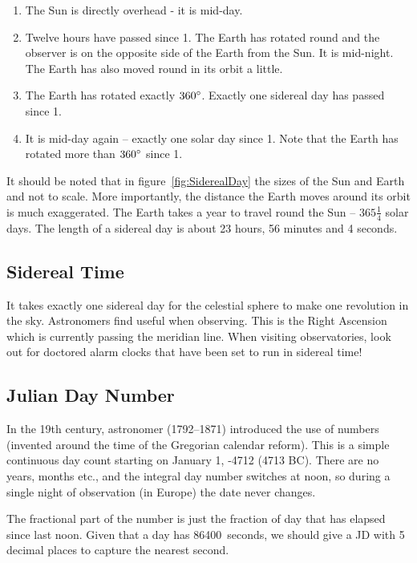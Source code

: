 \begin{enumerate}
\item
  The Sun is directly overhead - it is mid-day.
\item
  Twelve hours have passed since 1. The Earth has rotated round and the
  observer is on the opposite side of the Earth from the Sun. It is
  mid-night. The Earth has also moved round in its orbit a little.
\item
  The Earth has rotated exactly $360\degree$. Exactly one sidereal day has
  passed since 1.
\item
  It is mid-day again -- exactly one solar day since 1. Note that the
  Earth has rotated more than $360\degree$ since 1.
\end{enumerate}

\noindent It should be noted that in figure~\ref{fig:SiderealDay} the sizes of
the Sun and Earth and not to scale. More importantly, the distance the
Earth moves around its orbit is much exaggerated. The Earth takes a
year to travel round the Sun --
$365\frac{1}{4}$ solar days. The length of a
sidereal day is about 23 hours, 56 minutes and 4 seconds.

\subsection{Sidereal Time}
\label{sec:Concepts:SiderealTime}

It takes exactly one sidereal day for the celestial sphere to make one
revolution in the sky. Astronomers find 
useful when observing. This is the Right Ascension which is currently
passing the meridian line.  When visiting observatories, look out for
doctored alarm clocks that have been set to run in sidereal time!

\subsection{Julian Day Number}
\label{sec:Concepts:JulianDay}

In the 19th century, astronomer  (1792--1871) introduced the use of
 numbers (invented around the time of the Gregorian calendar
reform). This is a simple continuous day count starting on January 1, -4712
(4713 BC). There are no years, months etc., and the integral day
number switches at noon, so during a single night of observation (in
Europe) the date never changes. 

The fractional part of the number is just the fraction of day that has
elapsed since last noon. Given that a day has 86400~seconds, we should
give a JD with 5 decimal places to capture the nearest second.

